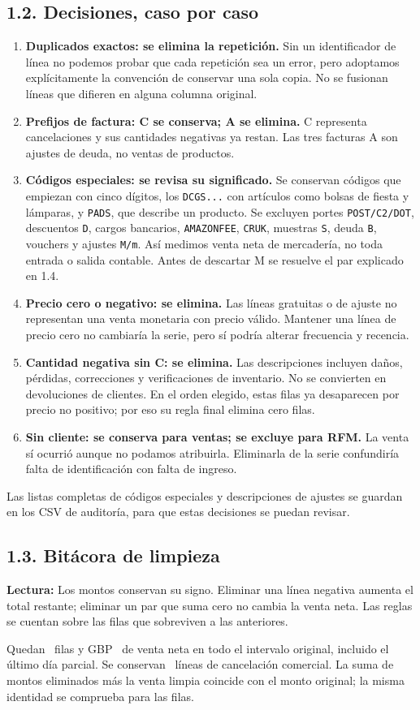 \documentclass[11pt,letterpaper]{article}
\newcommand{\tabla}[2]{\begin{center}\small\textbf{Lectura:} #2\end{center}}
\begin{document}
\subsection{1.2. Decisiones, caso por caso}
\begin{enumerate}[label=\textbf{(\alph*)}]
\item \textbf{Duplicados exactos: se elimina la repetición.} Sin un identificador de línea no podemos probar que cada repetición sea un error, pero adoptamos explícitamente la convención de conservar una sola copia. No se fusionan líneas que difieren en alguna columna original.
\item \textbf{Prefijos de factura: C se conserva; A se elimina.} C representa cancelaciones y sus cantidades negativas ya restan. Las tres facturas A son ajustes de deuda, no ventas de productos.
\item \textbf{Códigos especiales: se revisa su significado.} Se conservan códigos que empiezan con cinco dígitos, los \texttt{DCGS...} con artículos como bolsas de fiesta y lámparas, y \texttt{PADS}, que describe un producto. Se excluyen portes \texttt{POST/C2/DOT}, descuentos \texttt{D}, cargos bancarios, \texttt{AMAZONFEE}, \texttt{CRUK}, muestras \texttt{S}, deuda \texttt{B}, vouchers y ajustes \texttt{M/m}. Así medimos venta neta de mercadería, no toda entrada o salida contable. Antes de descartar M se resuelve el par explicado en 1.4.
\item \textbf{Precio cero o negativo: se elimina.} Las líneas gratuitas o de ajuste no representan una venta monetaria con precio válido. Mantener una línea de precio cero no cambiaría la serie, pero sí podría alterar frecuencia y recencia.
\item \textbf{Cantidad negativa sin C: se elimina.} Las descripciones incluyen daños, pérdidas, correcciones y verificaciones de inventario. No se convierten en devoluciones de clientes. En el orden elegido, estas filas ya desaparecen por precio no positivo; por eso su regla final elimina cero filas.
\item \textbf{Sin cliente: se conserva para ventas; se excluye para RFM.} La venta sí ocurrió aunque no podamos atribuirla. Eliminarla de la serie confundiría falta de identificación con falta de ingreso.
\end{enumerate}
Las listas completas de códigos especiales y descripciones de ajustes se guardan en los CSV de auditoría, para que estas decisiones se puedan revisar.

\subsection{1.3. Bitácora de limpieza}
\tabla{bitacora}{Los montos conservan su signo. Eliminar una línea negativa aumenta el total restante; eliminar un par que suma cero no cambia la venta neta. Las reglas se cuentan sobre las filas que sobreviven a las anteriores.}
Quedan \FilasLimpias\ filas y GBP \MontoLimpio\ de venta neta en todo el intervalo original, incluido el último día parcial. Se conservan \Devoluciones\ líneas de cancelación comercial. La suma de montos eliminados más la venta limpia coincide con el monto original; la misma identidad se comprueba para las filas.
\end{document}

